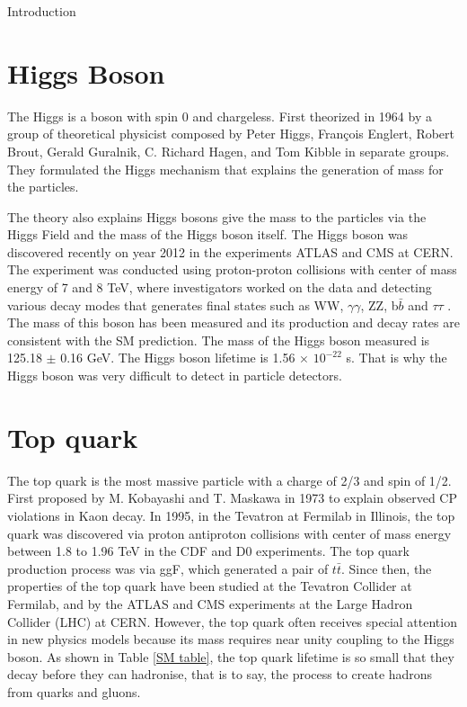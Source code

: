 \begin{chapter}{Introduction}
\section{Higgs Boson}
The Higgs is a boson with spin 0 and chargeless. First theorized in 1964 by a group of theoretical physicist composed by Peter Higgs, Fran\c cois Englert, Robert Brout, Gerald Guralnik, C. Richard Hagen, and Tom Kibble in separate groups. They formulated the Higgs mechanism that explains the generation of mass for the particles. 

The theory also explains Higgs bosons give the mass to the particles via the Higgs Field and the mass of the Higgs boson itself. The Higgs boson was discovered recently on year 2012 in the experiments ATLAS and CMS at CERN. The experiment was conducted using proton-proton collisions with center of mass energy of 7 and 8 TeV, where investigators worked on the data and detecting various decay modes that generates final states such as WW, $\gamma \gamma$, ZZ, b$\bar{b}$ and $\tau \tau$ \cite{higgsd,Aad_2012}. 
The mass of this boson has been measured and its production and decay
rates are consistent with the SM prediction. The mass of the Higgs boson measured is 125.18 $\pm$ 0.16 GeV\cite{pd}. The Higgs boson lifetime is 1.56 $\times$ $10^{-22}$ s. That is why the Higgs boson was very difficult to detect in particle detectors. 

\section{Top quark}
The top quark is the most massive particle with a charge of 2/3 and spin of 1/2. First proposed by M. Kobayashi and T. Maskawa in 1973 to explain observed CP violations in Kaon decay\cite{griff}. In 1995, in the Tevatron at Fermilab in Illinois, the top quark was discovered via proton antiproton collisions with center of mass energy between 1.8 to 1.96 TeV in the CDF and D0 experiments. The top quark production process was via ggF, which generated a pair of $t\bar{t}$\cite{top}.
Since then, the properties of the top quark have been studied at the Tevatron Collider at Fermilab, and by the ATLAS and CMS experiments at the Large Hadron Collider (LHC) at CERN.
However, the top quark often receives special attention in new physics models because its mass requires near unity coupling to the Higgs boson\cite{top}.
As shown in Table \ref{SM table}, the top quark lifetime is so small that they decay before they can hadronise, that is to say, the process to create hadrons from quarks and gluons.


\end{chapter}
